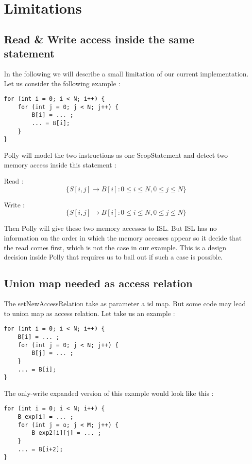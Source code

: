 \section{Limitations}
\subsection{Read & Write access inside the same statement}
In the following we will describe a small limitation of our current implementation. Let us consider the following example :

\begin{lstlisting}[frame=single]
for (int i = 0; i < N; i++) {
    for (int j = 0; j < N; j++) {
        B[i] = ... ;
        ... = B[i];
    }
}
\end{lstlisting}

Polly will model the two instructions as one ScopStatement and detect two memory access inside this statement :

Read :
\[
\{ S[i, j] \rightarrow B[i] : 0 \le i \le N, 0 \le j \le N \}
\]

Write :
\[
\{ S[i, j] \rightarrow B[i] : 0 \le i \le N, 0 \le j \le N \}
\]  
    
Then Polly will give these two memory accesses to ISL. But ISL has no information on the order in which the memory accesses appear so it decide that the read comes first, which is not the case in our example. This is a design decision inside Polly that requires us to bail out if such a case is possible.

\subsection{Union map needed as access relation}
The setNewAccessRelation take as parameter a isl map. But some code may lead to union map as access relation. Let take us an example :

\begin{lstlisting}[frame=single]
for (int i = 0; i < N; i++) {
    B[i] = ... ;
    for (int j = 0; j < N; j++) {
        B[j] = ... ;
    }
    ... = B[i];
}
\end{lstlisting}

The only-write expanded version of this example would look like this :

\begin{lstlisting}[frame=single]
for (int i = 0; i < N; i++) {
    B_exp[i] = ... ;
    for (int j = o; j < M; j++) {
        B_exp2[i][j] = ... ;
    }
    ... = B[i+2];
}
\end{lstlisting}

